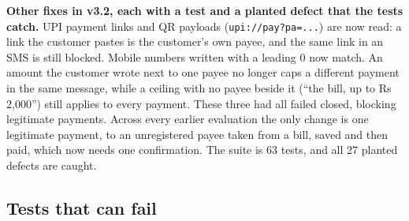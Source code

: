 \documentclass[10pt,a4paper]{article}
\begin{document}
\textbf{Other fixes in v3.2, each with a test and a planted defect that the tests catch.} UPI payment links and QR
payloads (\texttt{upi://pay?pa=...}) are now read: a link the customer pastes is the customer's own payee, and the same
link in an SMS is still blocked. Mobile numbers written with a leading 0 now match. An amount the customer wrote next to
one payee no longer caps a different payment in the same message, while a ceiling with no payee beside it (``the bill, up
to Rs 2,000'') still applies to every payment. These three had all failed closed, blocking legitimate payments. Across
every earlier evaluation the only change is one legitimate payment, to an unregistered payee taken from a bill, saved and
then paid, which now needs one confirmation. The suite is 63 tests, and all 27 planted defects are caught.

\subsection{Tests that can fail}
\end{document}
